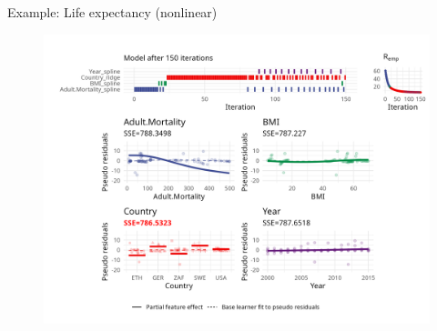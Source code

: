 \begin{frame}{Example: Life expectancy (nonlinear)}
	\begin{figure}
		\centering
		\includegraphics[width=\textwidth]{figures/cwb-anim/fig-iter-0150.png}
	\end{figure}
	\addtocounter{framenumber}{-1}
\end{frame}

